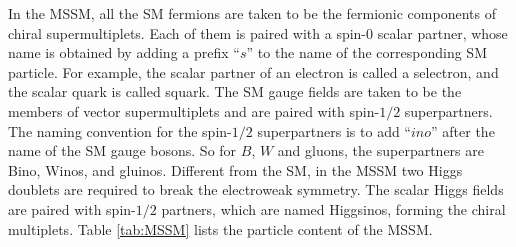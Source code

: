 \documentclass[thesis.tex]{subfiles}
\begin{document}
In the MSSM, all the SM fermions are taken to be the fermionic components of chiral supermultiplets. 
Each of them is paired with a spin-0 scalar partner, whose name is obtained by adding a prefix ``$s$'' to the name of the corresponding SM particle.
For example, the scalar partner of an electron is called a selectron, and the scalar quark is called squark. 
The SM gauge fields are taken to be the members of vector supermultiplets and are paired with spin-$1/2$ superpartners. 
The naming convention for the spin-$1/2$ superpartners is to add ``$ino$'' after the name of the SM gauge bosons. 
So for $B$, $W$ and gluons, the superpartners are Bino, Winos, and gluinos. 
Different from the SM, in the MSSM two Higgs doublets are required to break the electroweak symmetry. 
The scalar Higgs fields are paired with spin-$1/2$ partners, which are named Higgsinos, forming the chiral multiplets.
Table \ref{tab:MSSM} lists the particle content of the MSSM. 
\end{document}

